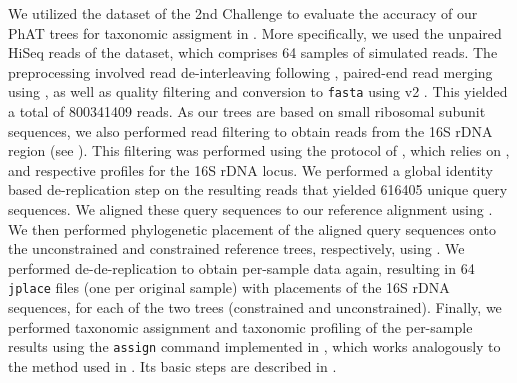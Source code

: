 We utilized the  dataset of the 2nd  Challenge \cite{Sczyrba2017,Bremges2018}
to evaluate the accuracy of our \ac{PhAT} trees for taxonomic assigment
in .
More specifically, we used the unpaired HiSeq reads of the dataset, %
which comprises \num{64} samples of simulated reads.
The preprocessing involved read de-interleaving following ,
paired-end read merging using  \cite{Zhang2014},
as well as quality filtering and conversion to \texttt{fasta} using  v2 \cite{Rognes2016}.
This yielded a total of \num{800 341 409} reads.
As our trees are based on small ribosomal subunit sequences,
we also performed read filtering to obtain reads from the 16S rDNA region
(see ).
This filtering was performed using the protocol of ,
which relies on  \cite{Eddy1998,Eddy2009}, and respective profiles for the 16S rDNA locus.
We performed a global identity based de-replication step on the resulting reads
that yielded \num{616 405} unique query sequences.
We aligned these query sequences to our  reference alignment
using  \cite{Berger2011a,Berger2012}.
We then performed phylogenetic placement of the aligned query sequences onto the unconstrained and constrained reference trees,
respectively, using  \cite{Barbera2018}.
We performed de-de-replication to obtain per-sample data again, %
resulting in \num{64} \texttt{jplace} files (one per original sample) with placements of the 16S rDNA sequences,
for each of the two trees (constrained and unconstrained).
Finally, we performed taxonomic assignment and taxonomic profiling of the per-sample results
using the \texttt{assign} command implemented in  \cite{Czech2019-genesis-gappa},
which works analogously to the method used in  \cite{Kozlov2016}.
Its basic steps are described in .
